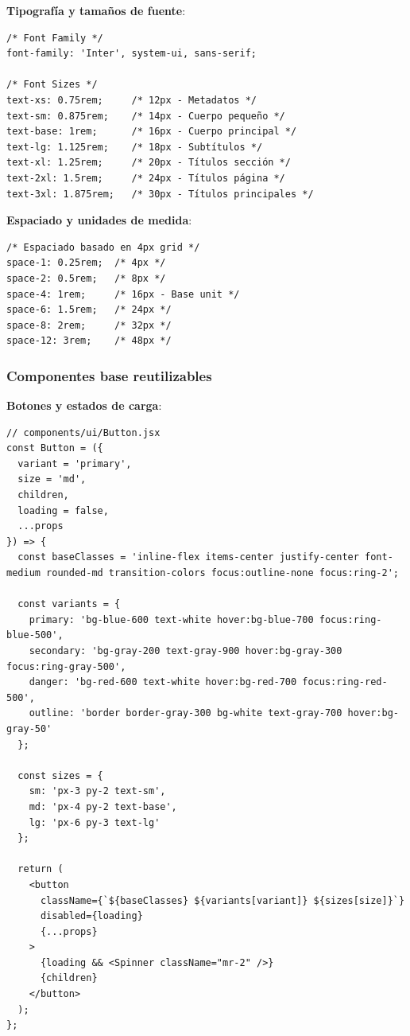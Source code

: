\documentclass[12pt,a4paper,oneside]{report}
\begin{document}
\textbf{Tipografía y tamaños de fuente}:

\begin{lstlisting}
/* Font Family */
font-family: 'Inter', system-ui, sans-serif;

/* Font Sizes */
text-xs: 0.75rem;     /* 12px - Metadatos */
text-sm: 0.875rem;    /* 14px - Cuerpo pequeño */
text-base: 1rem;      /* 16px - Cuerpo principal */
text-lg: 1.125rem;    /* 18px - Subtítulos */
text-xl: 1.25rem;     /* 20px - Títulos sección */
text-2xl: 1.5rem;     /* 24px - Títulos página */
text-3xl: 1.875rem;   /* 30px - Títulos principales */
\end{lstlisting}

\textbf{Espaciado y unidades de medida}:

\begin{lstlisting}
/* Espaciado basado en 4px grid */
space-1: 0.25rem;  /* 4px */
space-2: 0.5rem;   /* 8px */
space-4: 1rem;     /* 16px - Base unit */
space-6: 1.5rem;   /* 24px */
space-8: 2rem;     /* 32px */
space-12: 3rem;    /* 48px */
\end{lstlisting}

\subsubsection{Componentes base
reutilizables}\label{componentes-base-reutilizables}

\textbf{Botones y estados de carga}:

\begin{lstlisting}
// components/ui/Button.jsx
const Button = ({ 
  variant = 'primary', 
  size = 'md', 
  children, 
  loading = false,
  ...props 
}) => {
  const baseClasses = 'inline-flex items-center justify-center font-medium rounded-md transition-colors focus:outline-none focus:ring-2';
  
  const variants = {
    primary: 'bg-blue-600 text-white hover:bg-blue-700 focus:ring-blue-500',
    secondary: 'bg-gray-200 text-gray-900 hover:bg-gray-300 focus:ring-gray-500',
    danger: 'bg-red-600 text-white hover:bg-red-700 focus:ring-red-500',
    outline: 'border border-gray-300 bg-white text-gray-700 hover:bg-gray-50'
  };
  
  const sizes = {
    sm: 'px-3 py-2 text-sm',
    md: 'px-4 py-2 text-base',
    lg: 'px-6 py-3 text-lg'
  };
  
  return (
    <button 
      className={`${baseClasses} ${variants[variant]} ${sizes[size]}`}
      disabled={loading}
      {...props}
    >
      {loading && <Spinner className="mr-2" />}
      {children}
    </button>
  );
};
\end{lstlisting}
\end{document}
